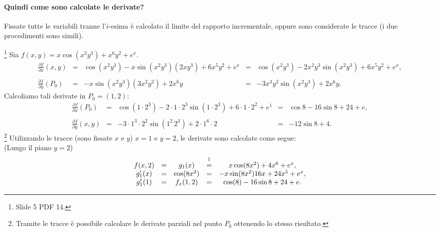 \paragraph{Quindi come sono calcolate le derivate?} Fissate tutte le variabili tranne l'$i$-esima è calcolato il limite del rapporto incrementale, oppure sono considerate le tracce (i due procedimenti sono simili).

\begin{example}\footnote{Slide 5 PDF 14.}
    Sia $f(x,y)=x\cos(x^2y^3)+x^6y^2+e^x$.
    \begin{equation}\label{eq:derivate_parziali_metodo_normale}
        \begin{matrix}
            \frac{\partial f}{\partial x}(x,y)&=& \cos(x^2y^3)-x\sin(x^2y^3)(2xy^3)+6x^5y^2+e^x&=&\cos(x^2y^3)-2x^2y^3\sin(x^2y^3)+6x^5y^2+e^x,\\\\
            \frac{\partial f}{\partial y}(P_0)&=& -x\sin(x^2y^3)(3x^2y^2)+2x^6y&=&-3x^3y^2\sin(x^2y^3)+2x^6y.
        \end{matrix}
    \end{equation}
    Calcoliamo tali derivate in $P_0=(1,2)$:
    \begin{equation*}
        \begin{matrix}
            \frac{\partial f}{\partial x}(P_0)&=& \cos(1\cdot 2^3)-2\cdot 1\cdot 2^3\sin(1\cdot 2^3)+6\cdot 1\cdot 2^2+e^1&=&\cos8 -16\sin8+24+ e,\\\\
            \frac{\partial f}{\partial y}(x,y)&=&-3\cdot 1^3\cdot 2^2\sin(1^2\,2^3)+2\cdot1^6\cdot2 &=&-12\sin8+4.
        \end{matrix}
    \end{equation*}
    \footnote{Tramite le tracce è possibile calcolare le derivate parziali nel punto $P_0$ ottenendo lo stesso risultato.}
    Utilizzando le tracce (sono fissate $x$ e $y$) $x=1$ e $y=2$, le  derivate sono calcolate come segue:\\
    (Lungo il piano $y=2$)
    \begin{equation*}
        \begin{matrix}
            f(x,2)&=&g_1(x)&\overset{\footnotemark}{=}&x\cos(8x^2)+4x^6+e^x,\\
            g'_1(x)&=&\cos(8x^2)&=&-x\sin(8x^2)16x+24x^5+e^x,\\
            g'_1(1)&=& f_x(1,2)&=& \cos(8)-16\sin8+24+e.
        \end{matrix}
    \end{equation*}

\end{example}
